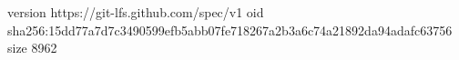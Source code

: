 version https://git-lfs.github.com/spec/v1
oid sha256:15dd77a7d7c3490599efb5abb07fe718267a2b3a6c74a21892da94adafc63756
size 8962
